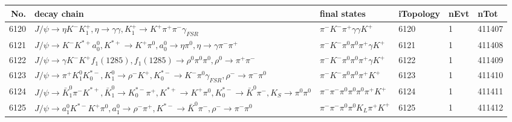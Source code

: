\begin{table}[htbp] 
\begin{center}
\begin{small}
\begin{tabular}{rlllll}\hline\hline
 No. & decay chain & final states &  iTopology & nEvt & nTot \\\hline
6120&$J/\psi       \rightarrow \eta          K^{-}          K_1^{+}        , \eta           \rightarrow \gamma       \gamma       , K_1^{+}         \rightarrow K^{+}          \pi^{+}        \pi^{-}        \gamma_{FSR} $&$\pi^{-}        K^{-}          \pi^{+}        \gamma       \gamma       K^{+}          $& 6120&    1&411407\\
6121&$J/\psi       \rightarrow K^{-}          K^{*+}         a_{0}^{0}      , K^{*+}          \rightarrow K^{+}          \pi^{0}        , a_{0}^{0}       \rightarrow \eta          \pi^{0}        , \eta           \rightarrow \gamma       \pi^{-}        \pi^{+}        $&$\pi^{-}        K^{-}          \pi^{0}        \pi^{0}        \pi^{+}        \gamma       K^{+}          $& 6121&    1&411408\\
6122&$J/\psi       \rightarrow \gamma       K^{-}          K^{+}          f_{1}(1285)    , f_{1}(1285)     \rightarrow \rho^{0}      \pi^{0}        \pi^{0}        , \rho^{0}       \rightarrow \pi^{+}        \pi^{-}        $&$\pi^{-}        K^{-}          \pi^{0}        \pi^{0}        \pi^{+}        \gamma       K^{+}          $& 6122&    1&411409\\
6123&$J/\psi       \rightarrow \pi^{+}        K_1^{0}        K_{0}^{*-}     , K_1^{0}         \rightarrow \rho^{-}      K^{+}          , K_{0}^{*-}      \rightarrow K^{-}          \pi^{0}        \gamma_{FSR} , \rho^{-}       \rightarrow \pi^{-}        \pi^{0}        $&$\pi^{-}        K^{-}          \pi^{0}        \pi^{0}        \pi^{+}        K^{+}          $& 6123&    1&411410\\
6124&$J/\psi       \rightarrow \bar{K}_1^{0} \pi^{-}        K^{*+}         , \bar{K}_1^{0}  \rightarrow K_{0}^{*-}     \pi^{+}        , K^{*+}          \rightarrow K^{+}          \pi^{0}        , K_{0}^{*-}      \rightarrow \bar{K}^{0}   \pi^{-}        , K_{S}           \rightarrow \pi^{0}        \pi^{0}        $&$\pi^{-}        \pi^{-}        \pi^{0}        \pi^{0}        \pi^{0}        \pi^{+}        K^{+}          $& 6124&    1&411411\\
6125&$J/\psi       \rightarrow a_{1}^{0}      K^{*-}         K^{+}          \pi^{0}        , a_{1}^{0}       \rightarrow \rho^{-}      \pi^{+}        , K^{*-}          \rightarrow \bar{K}^{0}   \pi^{-}        , \rho^{-}       \rightarrow \pi^{-}        \pi^{0}        $&$\pi^{-}        \pi^{-}        \pi^{0}        \pi^{0}        K_{L}          \pi^{+}        K^{+}          $& 6125&    1&411412\\

\end{tabular}
\end{small}
\end{center}
\end{table}
